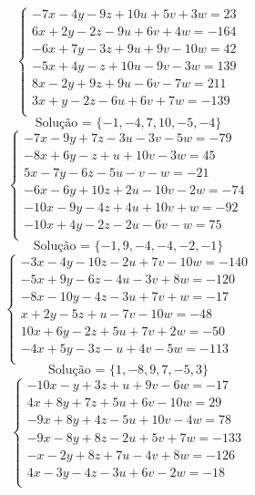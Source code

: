 \documentclass[12pt,oneside,a4paper]{article}
\begin{document}
\vspace{\baselineskip}
\begin{equation*}
\begin{cases}
-7x-4y-9z+10u+5v+3w=23 \\
6x+2y-2z-9u+6v+4w=-164 \\
-6x+7y-3z+9u+9v-10w=42 \\
-5x+4y-z+10u-9v-3w=139 \\
8x-2y+9z+9u-6v-7w=211 \\
3x+y-2z-6u+6v+7w=-139 \\
\end{cases}
\end{equation*}
\begin{equation*}
\text{Solução = }\{-1,-4,7,10,-5,-4\}
\end{equation*}
\vspace{\baselineskip}
\begin{equation*}
\begin{cases}
-7x-9y+7z-3u-3v-5w=-79 \\
-8x+6y-z+u+10v-3w=45 \\
5x-7y-6z-5u-v-w=-21 \\
-6x-6y+10z+2u-10v-2w=-74 \\
-10x-9y-4z+4u+10v+w=-92 \\
-10x+4y-2z-2u-6v-w=75 \\
\end{cases}
\end{equation*}
\begin{equation*}
\text{Solução = }\{-1,9,-4,-4,-2,-1\}
\end{equation*}
\vspace{\baselineskip}
\begin{equation*}
\begin{cases}
-3x-4y-10z-2u+7v-10w=-140 \\
-5x+9y-6z-4u-3v+8w=-120 \\
-8x-10y-4z-3u+7v+w=-17 \\
x+2y-5z+u-7v-10w=-48 \\
10x+6y-2z+5u+7v+2w=-50 \\
-4x+5y-3z-u+4v-5w=-113 \\
\end{cases}
\end{equation*}
\begin{equation*}
\text{Solução = }\{1,-8,9,7,-5,3\}
\end{equation*}
\vspace{\baselineskip}
\begin{equation*}
\begin{cases}
-10x-y+3z+u+9v-6w=-17 \\
4x+8y+7z+5u+6v-10w=29 \\
-9x+8y+4z-5u+10v-4w=78 \\
-9x-8y+8z-2u+5v+7w=-133 \\
-x-2y+8z+7u-4v+8w=-126 \\
4x-3y-4z-3u+6v-2w=-18 \\
\end{cases}
\end{equation*}
\end{document}
